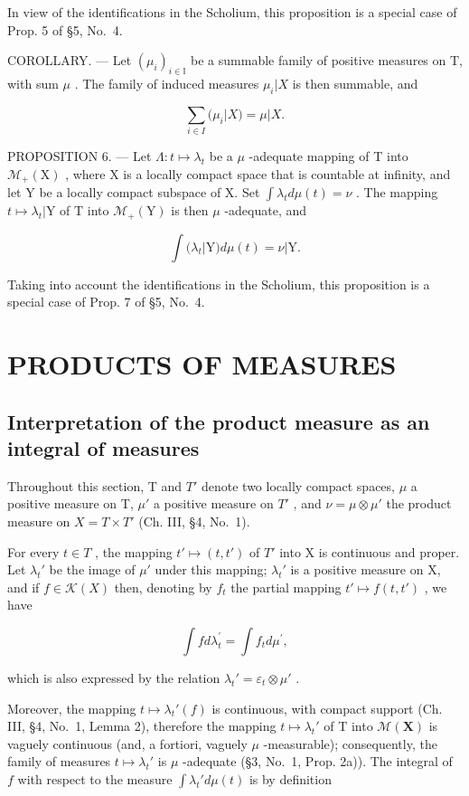 In view of the identifications in the Scholium, this proposition is a special case of Prop. 5 of §5, No.~4.

COROLLARY. --- Let \((\mu_{i})_{i\in\mathbb{I}}\) be a summable family of positive measures on T, with sum \(\mu\) . The family of induced measures \(\mu_{i}|X\) is then summable, and

\[
\sum_ {i \in I} (\mu_ {i} | X) = \mu | X.\tag{9}
\]

PROPOSITION 6. --- Let \(\Lambda: t \mapsto \lambda_t\) be a \(\mu\) -adequate mapping of T into \(\mathcal{M}_+(\mathrm{X})\) , where X is a locally compact space that is countable at infinity, and let Y be a locally compact subspace of X. Set \(\int \lambda_t d\mu(t) = \nu\) . The mapping \(t \mapsto \lambda_t|\mathrm{Y}\) of T into \(\mathcal{M}_+(\mathrm{Y})\) is then \(\mu\) -adequate, and

\[
\int (\lambda_ {t} | \mathrm{Y}) d \mu (t) = \nu | \mathrm{Y}.\tag{10}
\]

Taking into account the identifications in the Scholium, this proposition is a special case of Prop. 7 of §5, No.~4.

\section{PRODUCTS OF MEASURES}

\subsection{Interpretation of the product measure as an integral of measures}

Throughout this section, T and \(T'\) denote two locally compact spaces, \(\mu\) a positive measure on T, \(\mu'\) a positive measure on \(T'\) , and \(\nu = \mu \otimes \mu'\) the product measure on \(X = T \times T'\) (Ch. III, §4, No.~1).

For every \(t \in T\) , the mapping \(t' \mapsto (t, t')\) of \(T'\) into X is continuous and proper. Let \(\lambda_t'\) be the image of \(\mu'\) under this mapping; \(\lambda_t'\) is a positive measure on X, and if \(f \in \mathcal{K}(X)\) then, denoting by \(f_t\) the partial mapping \(t' \mapsto f(t, t')\) , we have

\[
\int f d \lambda_ {t} ^ {\prime} = \int f _ {t} d \mu^ {\prime},\tag{1}
\]

which is also expressed by the relation \(\lambda_t' = \varepsilon_t \otimes \mu'\) .

Moreover, the mapping \(t \mapsto \lambda_t'(f)\) is continuous, with compact support (Ch. III, §4, No.~1, Lemma 2), therefore the mapping \(t \mapsto \lambda_t'\) of T into \(\mathcal{M}(\mathbf{X})\) is vaguely continuous (and, a fortiori, vaguely \(\mu\) -measurable); consequently, the family of measures \(t \mapsto \lambda_t'\) is \(\mu\) -adequate (§3, No.~1, Prop. 2a)). The integral of \(f\) with respect to the measure \(\int \lambda_t' d\mu(t)\) is by definition


